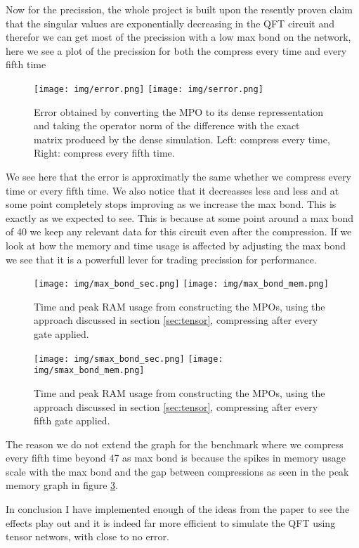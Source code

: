 Now for the precission, the whole project is built upon the resently proven claim that the singular values are exponentially decreasing in the QFT circuit and therefor we can get most of the precission with a low max bond on the network, here we see a plot of the precission for both the compress every time and every fifth time 
\begin{figure}[H]
    \begin{center}
        \texttt{[image: img/error.png]}
        \texttt{[image: img/serror.png]}
    \end{center}
    \caption{Error obtained by converting the MPO to its dense repressentation and taking the operator norm of the difference with the exact matrix produced by the dense simulation. Left: compress every time, Right: compress every fifth time. }
    \label{fig:tensor_error}
\end{figure}
We see here that the error is approximatly the same whether we compress every time or every fifth time. We also notice that it decreasses less and less and at some point completely stops improving as we increase the max bond. This is exactly as we expected to see. This is because at some point around a max bond of 40 we keep any relevant data for this circuit even after the compression. If we look at how the memory and time usage is affected by adjusting the max bond we see that it is a powerfull lever for trading precission for performance. 

\begin{figure}[H]
    \begin{center}
        \texttt{[image: img/max\_bond\_sec.png]}
        \texttt{[image: img/max\_bond\_mem.png]}
    \end{center}
    \caption{Time and peak RAM usage from constructing the MPOs, using the approach discussed in section \ref{sec:tensor}, compressing after every gate applied.}
    \label{fig:tensor_perf_max_bond}
\end{figure}
\begin{figure}[H]
    \begin{center}
        \texttt{[image: img/smax\_bond\_sec.png]}
        \texttt{[image: img/smax\_bond\_mem.png]}
    \end{center}
    \caption{Time and peak RAM usage from constructing the MPOs, using the approach discussed in section \ref{sec:tensor}, compressing after every fifth gate applied.}
    \label{fig:stensor_perf_max_bond}
\end{figure}
The reason we do not extend the graph for the benchmark where we compress every fifth time beyond 47 as max bond is because the spikes in memory usage scale with the max bond and the gap between compressions as seen in the peak memory graph in figure \ref{fig:stensor_perf_max_bond}. 

In conclusion I have implemented enough of the ideas from the paper to see the effects play out and it is indeed far more efficient to simulate the QFT using tensor networs, with close to no error. 
